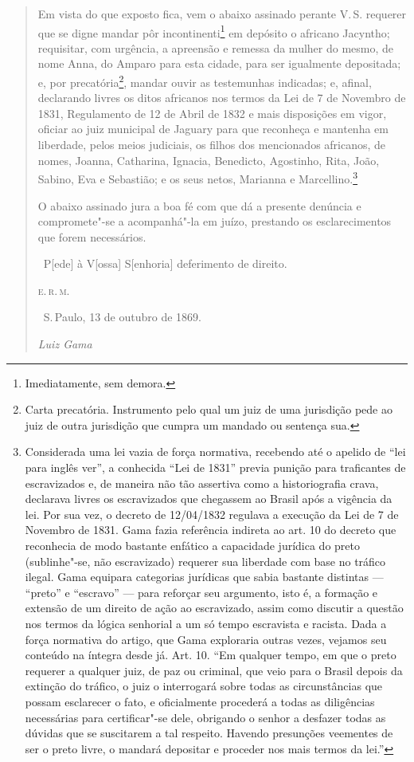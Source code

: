 \begin{quote}
Em vista do que exposto fica, vem o abaixo assinado perante V.\,S.
requerer que se digne mandar pôr incontinenti\footnote{Imediatamente,
  sem demora.} em depósito o africano Jacyntho; requisitar, com
urgência, a apreensão e remessa da mulher do mesmo, de nome Anna, do
Amparo para esta cidade, para ser igualmente depositada; e, por
precatória\footnote{Carta precatória. Instrumento pelo qual um juiz de
  uma jurisdição pede ao juiz de outra jurisdição que cumpra um mandado
  ou sentença sua.}, mandar ouvir as testemunhas indicadas; e, afinal,
declarando livres os ditos africanos nos termos da Lei de 7 de Novembro
de 1831, Regulamento de 12 de Abril de 1832 e mais disposições em vigor,
oficiar ao juiz municipal de Jaguary para que reconheça e mantenha em
liberdade, pelos meios judiciais, os filhos dos mencionados africanos,
de nomes, Joanna, Catharina, Ignacia, Benedicto, Agostinho, Rita, João,
Sabino, Eva e Sebastião; e os seus netos, Marianna e
Marcellino.\footnote{Considerada uma lei vazia de força normativa,
  recebendo até o apelido de ``lei para inglês ver'', a conhecida ``Lei de
  1831'' previa punição para traficantes de escravizados e, de maneira
  não tão assertiva como a historiografia crava, declarava livres os
  escravizados que chegassem ao Brasil após a vigência da lei. Por sua
  vez, o decreto de 12/04/1832 regulava a execução da Lei de 7 de
  Novembro de 1831. Gama fazia referência indireta ao art.
  10 do decreto que reconhecia de modo bastante enfático a capacidade
  jurídica do preto (sublinhe"-se, não escravizado) requerer sua
  liberdade com base no tráfico ilegal. Gama equipara categorias
  jurídicas que sabia bastante distintas --- ``preto'' e ``escravo'' --- para
  reforçar seu argumento, isto é, a formação e extensão de um direito de
  ação ao escravizado, assim como discutir a questão nos termos da
  lógica senhorial a um só tempo escravista e racista. Dada a força
  normativa do artigo, que Gama exploraria outras vezes, vejamos seu conteúdo na
  íntegra desde já. Art. 10. ``Em qualquer tempo, em que o preto requerer
  a qualquer juiz, de paz ou criminal, que veio para o Brasil depois da
  extinção do tráfico, o juiz o interrogará sobre todas as
  circunstâncias que possam esclarecer o fato, e oficialmente procederá
  a todas as diligências necessárias para certificar"-se dele, obrigando
  o senhor a desfazer todas as dúvidas que se suscitarem a tal respeito.
  Havendo presunções veementes de ser o preto livre, o mandará depositar
  e proceder nos mais termos da lei.''}

O abaixo assinado jura a boa fé com que dá a presente denúncia e
compromete"-se a acompanhá"-la em juízo, prestando os esclarecimentos que
forem necessários.

\hfill\ P{[}ede{]} à V{[}ossa{]} S{[}enhoria{]} deferimento de direito.

\hfill\textsc{e.\,r.\,m.}

\medskip

\hfill\ S.\,Paulo, 13 de outubro de 1869.\smallskip

\hfill\emph{Luiz Gama}
\end{quote}

